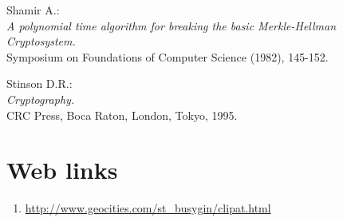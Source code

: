 \begin{thebibliography}{99}
     
       Shamir A.: \\
       \emph{A polynomial time algorithm for breaking the basic 
             Merkle-Hellman Cryptosystem.} \\
       Symposium on Foundations of Computer Science (1982), 145-152.
           
     
       Stinson D.R.: \\
       \emph{Cryptography.} \\
       CRC Press, Boca Raton, London, Tokyo, 1995.

\end{thebibliography}


\section*{Web links} 
\begin{enumerate}
   \item \href{http://www.geocities.com/st_busygin/clipat.html}
              {http://www.geocities.com/st\_busygin/clipat.html }
\end{enumerate}

